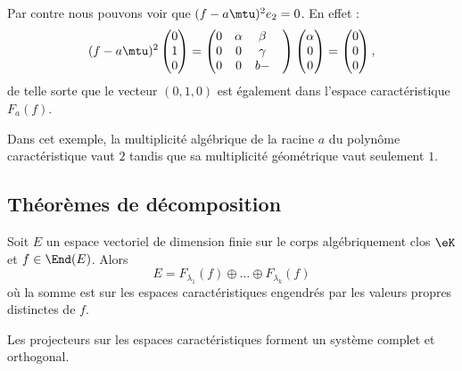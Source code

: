 \begin{remark}
    Par contre nous pouvons voir que \( (f-a\mtu)^2e_2=0\). En effet :
    \begin{equation}
        (f-a\mtu)^2\begin{pmatrix}
            0    \\ 
            1    \\ 
            0    
        \end{pmatrix}=\begin{pmatrix}
            0    &   \alpha    &   \beta    \\
            0    &   0    &   \gamma    \\
            0    &   0    &   b-&
        \end{pmatrix}\begin{pmatrix}
            \alpha    \\ 
            0    \\ 
            0    
        \end{pmatrix}=\begin{pmatrix}
            0    \\ 
            0    \\ 
            0    
        \end{pmatrix},
    \end{equation}
    de telle sorte que le vecteur \( (0,1,0)\) est également dans l'espace caractéristique \( F_a(f)\).

    Dans cet exemple, la multiplicité algébrique de la racine \( a\) du polynôme caractéristique vaut \( 2\) tandis que sa multiplicité géométrique vaut seulement \( 1\).
\end{remark}

\subsection{Théorèmes de décomposition}

\begin{theorem}     \label{ThoSpectraluRMLok}
    Soit \( E\) un espace vectoriel de dimension finie sur le corps algébriquement clos \( \eK\) et \( f\in\End(E)\). Alors
    \begin{equation}    \label{EqCTFHooBSGhYK}
        E=F_{\lambda_1}(f)\oplus\ldots\oplus F_{\lambda_k}(f)
    \end{equation}
    où la somme est sur les espaces caractéristiques engendrés par les valeurs propres distinctes de \( f\).

    Les projecteurs sur les espaces caractéristiques forment un système complet et orthogonal.
\end{theorem}


